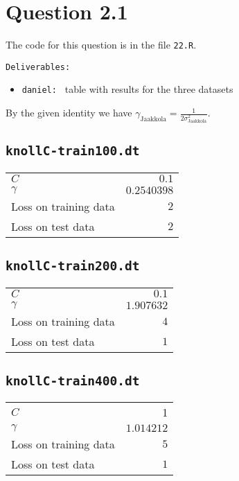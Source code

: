 \section*{Question 2.1}

The code for this question is in the file \texttt{22.R}.

\texttt{Deliverables: } 
\begin{itemize}
	\item \texttt{daniel: } table with results for the three datasets 
\end{itemize}

By the given identity we have
$\gamma_{\text{Jaakkola}}=\frac{1}{2\sigma_{\text{Jaakkola}}^2}$.

\subsection*{\texttt{knollC-train100.dt}}
\begin{tabular}{|l|r|}
$C$ & $0.1$ \\
$\gamma$ & $0.2540398$ \\\hline
Loss on training data & $2$ \\
Loss on test data & $2$ \\\hline
\end{tabular}

\subsection*{\texttt{knollC-train200.dt}}
\begin{tabular}{|l|r|}
$C$ & $0.1$ \\
$\gamma$ & $1.907632$ \\\hline
Loss on training data & $4$ \\
Loss on test data & $1$ \\\hline
\end{tabular}

\subsection*{\texttt{knollC-train400.dt}}
\begin{tabular}{|l|r|}
$C$ & 1 \\
$\gamma$ & $1.014212$ \\\hline
Loss on training data & $5$ \\
Loss on test data & $1$ \\\hline
\end{tabular}